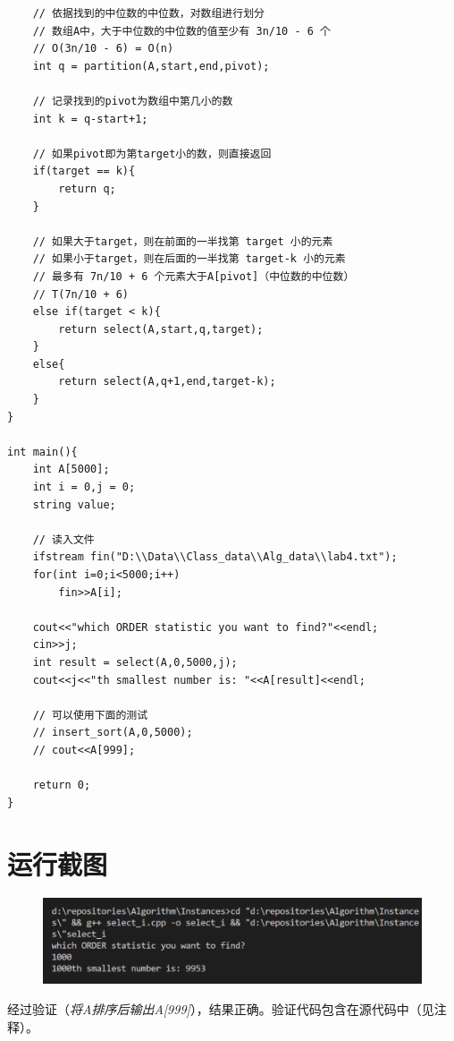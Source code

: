 \documentclass{ctexart}[UTF8]
\begin{document}
\begin{lstlisting}
    // 依据找到的中位数的中位数，对数组进行划分
    // 数组A中，大于中位数的中位数的值至少有 3n/10 - 6 个
    // O(3n/10 - 6) = O(n)
    int q = partition(A,start,end,pivot);

    // 记录找到的pivot为数组中第几小的数
    int k = q-start+1;

    // 如果pivot即为第target小的数，则直接返回
    if(target == k){
        return q;
    }

    // 如果大于target，则在前面的一半找第 target 小的元素
    // 如果小于target，则在后面的一半找第 target-k 小的元素
    // 最多有 7n/10 + 6 个元素大于A[pivot]（中位数的中位数）
    // T(7n/10 + 6)
    else if(target < k){
        return select(A,start,q,target);
    }
    else{
        return select(A,q+1,end,target-k);
    }
}

int main(){
    int A[5000];
    int i = 0,j = 0;
    string value;

    // 读入文件
    ifstream fin("D:\\Data\\Class_data\\Alg_data\\lab4.txt");
    for(int i=0;i<5000;i++)
		fin>>A[i];

    cout<<"which ORDER statistic you want to find?"<<endl;
    cin>>j;
    int result = select(A,0,5000,j);
    cout<<j<<"th smallest number is: "<<A[result]<<endl;

    // 可以使用下面的测试
    // insert_sort(A,0,5000);
    // cout<<A[999];
    
    return 0;
}
    \end{lstlisting}
    \section{运行截图}
        \begin{figure}[H]
            \centering
            \includegraphics[width=12cm]{../Resources/6_1.png}
        \end{figure}
    经过验证（\emph{将A排序后输出A[999]}），结果正确。验证代码包含在源代码中（见注释）。
 
\end{document}
